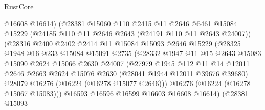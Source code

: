 \begin{lexlean}{RustCore}
\begin{coremodule}
                            @16608
                            @16614)
                          (@28381
                            @15060
                            @110
                            @2415
                            @11
                            @2646
                            @5461
                            @15084
                            @15229
                            (@24185 @110 @11 @2646 @2643 (@24191 @110 @11 @2643 @24007))
                            (@28316
                              @2400
                              @2402
                              @2414
                              @11
                              @15084
                              @15093
                              @2646
                              @15229
                              (@28325
                                @1948
                                @16
                                @233
                                @15084
                                @15091
                                @2735
                                (@28332
                                  @1947
                                  @11
                                  @15
                                  @2643
                                  @15083
                                  @15090
                                  @2624
                                  @15066
                                  @2630
                                  @24007
                                  (@27979
                                    @1945
                                    @112
                                    @11
                                    @14
                                    @12011
                                    @2646
                                    @2663
                                    @2624
                                    @15076
                                    @2630
                                    (@28041 @1944 @12011 @39676 @39680)
                                    @28079
                                    @16276
                                    (@16224 (@16278 @15077 @2646)))
                                  @16276
                                  (@16224 (@16278 @15067 @15083)))
                                @16593
                                @16596
                                @16599
                                @16603
                                @16608
                                @16614)
                              (@28381
                                @15093

\end{coremodule}
\end{lexlean}
